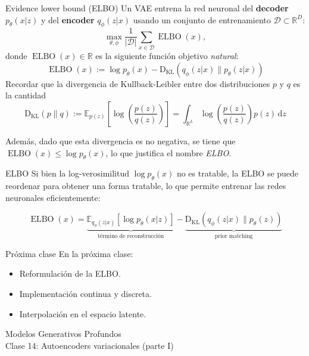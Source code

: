 \documentclass{beamer}
\newcommand{\R}{\mathbb{R}}
\begin{document}
\begin{frame}{Evidence lower bound (ELBO)}
    Un VAE entrena la red neuronal del \textbf{decoder} $p_\theta(x|z)$ y del \textbf{encoder} $q_\phi(z|x)$ usando un conjunto de entrenamiento $\mathcal{D}\subset\R^D$:
    \begin{equation*}
        \max_{\theta,\phi} \frac{1}{|\mathcal{D}|}\sum_{x\in\mathcal{D}} \operatorname{ELBO}(x),
    \end{equation*}
    donde $\operatorname{ELBO}(x)\in\R$ es la siguiente función objetivo \textit{natural}:
    \begin{equation*}
        \operatorname{ELBO}(x):=\log p_\theta(x)-\operatorname{{D}_{KL}}\left(q_\phi(z|x)\| p_\theta(z|x)\right)
    \end{equation*}
    Recordar que la divergencia de Kullback-Leibler entre dos distribuciones $p$ y $q$ es la cantidad
    \begin{equation*}
        \operatorname{D_{KL}}(p\|q):=\mathbb{E}_{p(z)}\left[\log\left(\frac{p(z)}{q(z)}\right)\right]
        = \int_{\R^L} \log\left(\frac{p(z)}{q(z)}\right)p(z)\,\text{d}z
    \end{equation*}

    Además, dado que esta divergencia es no negativa, se tiene que $\operatorname{ELBO}(x)\leq \log p_\theta(x)$, lo que justifica el nombre \textit{ELBO}.
\end{frame}

\begin{frame}{ELBO}
    Si bien la log-verosimilitud $\log p_\theta(x)$ no es tratable, la ELBO se puede reordenar para obtener una forma tratable, lo que permite entrenar las redes neuronales eficientemente:

    \begin{equation*}
        \operatorname{ELBO}(x) = \underbrace{\mathbb{E}_{q_\phi(z|x)}\left[\log p_\theta(x|z)\right]}_{\text{término de reconstrucción}} - \underbrace{\operatorname{{D}_{KL}}\left(q_\phi(z|x)\| p_\theta(z)\right)}_{\text{prior matching}}
    \end{equation*}


\end{frame}

\begin{frame}{Próxima clase}
    En la próxima clase:
    \begin{itemize}
        \item Reformulación de la ELBO.
        \item Implementación continua y discreta.
        \item Interpolación en el espacio latente.
    \end{itemize}
\end{frame}

\begin{frame}
    \centering
    \Large{Modelos Generativos Profundos}\\
    \large{Clase 14: Autoencoders variacionales (parte I)}
\end{frame}
\end{document}
